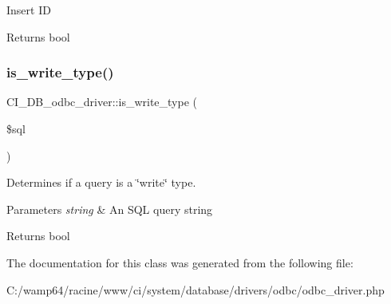 Insert ID

\begin{DoxyReturn}{Returns}
bool 
\end{DoxyReturn}
\mbox{\label{class_c_i___d_b__odbc__driver_a34015edad08eb1922dec8269f4bf87f1}} 
\subsubsection{\texorpdfstring{is\+\_\+write\+\_\+type()}{is\_write\_type()}}
{\footnotesize\ttfamily C\+I\+\_\+\+D\+B\+\_\+odbc\+\_\+driver\+::is\+\_\+write\+\_\+type (\begin{DoxyParamCaption}\item[{}]{\$sql }\end{DoxyParamCaption})}

Determines if a query is a \char`\"{}write\char`\"{} type.


\begin{DoxyParams}{Parameters}
{\em string} & An S\+QL query string \\
\hline
\end{DoxyParams}
\begin{DoxyReturn}{Returns}
bool 
\end{DoxyReturn}


The documentation for this class was generated from the following file\+:\begin{DoxyCompactItemize}
\item 
C\+:/wamp64/racine/www/ci/system/database/drivers/odbc/odbc\+\_\+driver.\+php\end{DoxyCompactItemize}
